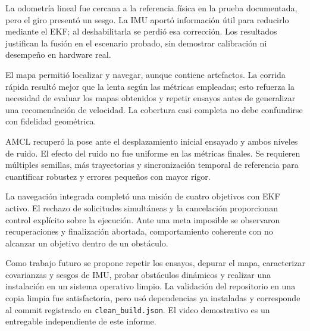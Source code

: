 \documentclass[11pt,a4paper]{article}
\newcommand{\archivo}[1]{\nolinkurl{#1}}
\begin{document}
La odometría lineal fue cercana a la referencia física en la prueba documentada, pero el giro presentó un sesgo. La IMU aportó información útil para reducirlo mediante el EKF; al deshabilitarla se perdió esa corrección. Los resultados justifican la fusión en el escenario probado, sin demostrar calibración ni desempeño en hardware real.

El mapa permitió localizar y navegar, aunque contiene artefactos. La corrida rápida resultó mejor que la lenta según las métricas empleadas; esto refuerza la necesidad de evaluar los mapas obtenidos y repetir ensayos antes de generalizar una recomendación de velocidad. La cobertura casi completa no debe confundirse con fidelidad geométrica.

AMCL recuperó la pose ante el desplazamiento inicial ensayado y ambos niveles de ruido. El efecto del ruido no fue uniforme en las métricas finales. Se requieren múltiples semillas, más trayectorias y sincronización temporal de referencia para cuantificar robustez y errores pequeños con mayor rigor.

La navegación integrada completó una misión de cuatro objetivos con EKF activo. El rechazo de solicitudes simultáneas y la cancelación proporcionan control explícito sobre la ejecución. Ante una meta imposible se observaron recuperaciones y finalización abortada, comportamiento coherente con no alcanzar un objetivo dentro de un obstáculo.

Como trabajo futuro se propone repetir los ensayos, depurar el mapa, caracterizar covarianzas y sesgos de IMU, probar obstáculos dinámicos y realizar una instalación en un sistema operativo limpio. La validación del repositorio en una copia limpia fue satisfactoria, pero usó dependencias ya instaladas y corresponde al commit registrado en \archivo{clean_build.json}. El video demostrativo es un entregable independiente de este informe.

\appendix
\end{document}
